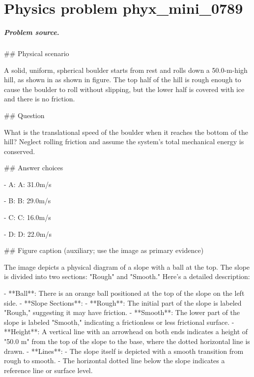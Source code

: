 
\chapter{Physics problem phyx\_mini\_0789}
\label{ch:PhyXMiniProblems_problem_phyx_mini_0789}

\paragraph{Problem source.}
\#\# Physical scenario

A solid, uniform, spherical boulder starts from rest and rolls down a 50.0-m-high hill, as shown in as shown in figure. The top half of the hill is rough enough to cause the boulder to roll without slipping, but the lower half is covered with ice and there is no friction.

\#\# Question

What is the translational speed of the boulder when it reaches the bottom of the hill? Neglect rolling friction and assume the system’s total mechanical energy is conserved.

\#\# Answer choices

- A: A: 31.0m/s

- B: B: 29.0m/s

- C: C: 16.0m/s

- D: D: 22.0m/s

\#\# Figure caption (auxiliary; use the image as primary evidence)

The image depicts a physical diagram of a slope with a ball at the top. The slope is divided into two sections: "Rough" and "Smooth." Here’s a detailed description:

- **Ball**: There is an orange ball positioned at the top of the slope on the left side.
- **Slope Sections**: 
  - **Rough**: The initial part of the slope is labeled "Rough," suggesting it may have friction.
  - **Smooth**: The lower part of the slope is labeled "Smooth," indicating a frictionless or less frictional surface.
- **Height**: A vertical line with an arrowhead on both ends indicates a height of "50.0 m" from the top of the slope to the base, where the dotted horizontal line is drawn.
- **Lines**:
  - The slope itself is depicted with a smooth transition from rough to smooth. 
  - The horizontal dotted line below the slope indicates a reference line or surface level.

